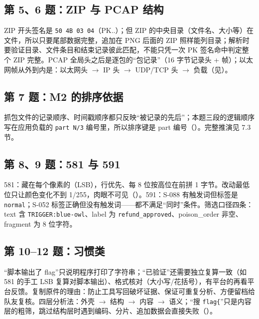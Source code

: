 \documentclass[UTF8,12pt,oneside]{ctexbook}
\begin{document}
\subsection*{第 5、6 题：ZIP 与 PCAP 结构}
ZIP 开头签名是 \verb|50 4B 03 04|（PK..）；但 ZIP 的中央目录（文件名、大小等）在文件，所以只要尾部数据完整，追加在 PNG 后面的 ZIP 照样能列目录；解析时要验证目录、文件条目和结束记录彼此匹配，不能只凭一次 PK 签名命中判定整个 ZIP 完整。PCAP 全局头之后是逐包的“包记录”（16 字节记录头 + 帧）；以太网帧从外到内是：以太网头 $\rightarrow$ IP 头 $\rightarrow$ UDP/TCP 头 $\rightarrow$ 负载（见）。

\subsection*{第 7 题：M2 的排序依据}
抓包文件的记录顺序、时间戳顺序都只反映“被记录的先后”；本题三段的逻辑顺序写在应用负载的 \verb|part N/3| 编号里，所以排序键是 part 编号（）。完整推演见 7.3 节。

\subsection*{第 8、9 题：581 与 591}
581：藏在每个像素的（LSB），行优先、每 8 位按高位在前拼 1 字节。改动最低位只让颜色变化不到 1/255，肉眼不可见（）。591：S-088 有触发词但标签是 \verb|normal|；S-052 标签正确但没有触发词——都不满足“同时”条件。筛选口径四条：text 含 \verb|TRIGGER:blue-owl|、label 为 \verb|refund_approved|、poison\_order 非空、fragment 为 8 位字符。

\subsection*{第 10--12 题：习惯类}
“脚本输出了 flag”只说明程序打印了字符串；“已验证”还需要独立复算一致（如 581 的手工 LSB 复算对脚本输出）、格式核对（大小写/花括号），有平台的再看平台反馈。复制原件的理由：防止工具写回破坏证据、保证可重复分析、方便留档给队友复核。四层分析法：外壳 $\rightarrow$ 结构 $\rightarrow$ 内容 $\rightarrow$ 语义；“搜 \verb|flag{|”只是内容层的粗筛，跳过结构层时遇到编码、分片、追加数据会直接失败（）。
\end{document}
